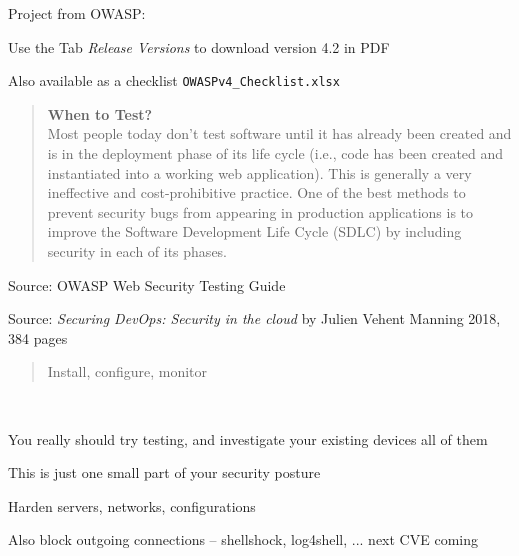\documentclass[Screen16to9,17pt]{foils}
\begin{document}
\begin{list2}
\item Project from OWASP:\\
\item Use the Tab \emph{Release Versions} to download version 4.2 in PDF
\item Also available as a checklist \verb+OWASPv4_Checklist.xlsx+
\end{list2}




\begin{quote}\small{\bf
When to Test?}\\
Most people today don’t test software until it has already been created and is in the deployment phase of its life cycle (i.e., code has been created and instantiated into a working web application). This is generally a very ineffective and cost-prohibitive practice. One of the best methods to prevent security bugs from appearing in production applications is to improve the Software Development Life Cycle (SDLC) by including security in each of its phases.
\end{quote}
Source: OWASP Web Security Testing Guide



Source:
\emph{Securing DevOps: Security in the cloud} by Julien Vehent
Manning 2018, 384 pages



\begin{quote}\Large
Install, configure, monitor
\end{quote}

~
\begin{list2}
\item You really should try testing, and investigate your existing devices
all of them
\item This is just one small part of your security posture
\item Harden servers, networks, configurations
\item Also block outgoing connections -- shellshock, log4shell, ... next CVE coming

\end{list2}

\myquestionspage
\end{document}

